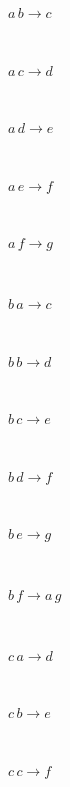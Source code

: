 \begin{minipage}{6in}
$
a\,
 b\rightarrow c
$
\end{minipage}\medskip \\
\begin{minipage}{6in}
$
a\,
 c\rightarrow d
$
\end{minipage}\medskip \\
\begin{minipage}{6in}
$
a\,
 d\rightarrow e
$
\end{minipage}\medskip \\
\begin{minipage}{6in}
$
a\,
 e\rightarrow f
$
\end{minipage}\medskip \\
\begin{minipage}{6in}
$
a\,
 f\rightarrow g
$
\end{minipage}\medskip \\
\begin{minipage}{6in}
$
b\,
 a\rightarrow c
$
\end{minipage}\medskip \\
\begin{minipage}{6in}
$
b\,
 b\rightarrow d
$
\end{minipage}\medskip \\
\begin{minipage}{6in}
$
b\,
 c\rightarrow e
$
\end{minipage}\medskip \\
\begin{minipage}{6in}
$
b\,
 d\rightarrow f
$
\end{minipage}\medskip \\
\begin{minipage}{6in}
$
b\,
 e\rightarrow g
$
\end{minipage}\medskip \\
\begin{minipage}{6in}
$
b\,
 f\rightarrow a\,
 g
$
\end{minipage}\medskip \\
\begin{minipage}{6in}
$
c\,
 a\rightarrow d
$
\end{minipage}\medskip \\
\begin{minipage}{6in}
$
c\,
 b\rightarrow e
$
\end{minipage}\medskip \\
\begin{minipage}{6in}
$
c\,
 c\rightarrow f
$
\end{minipage}\medskip \\
